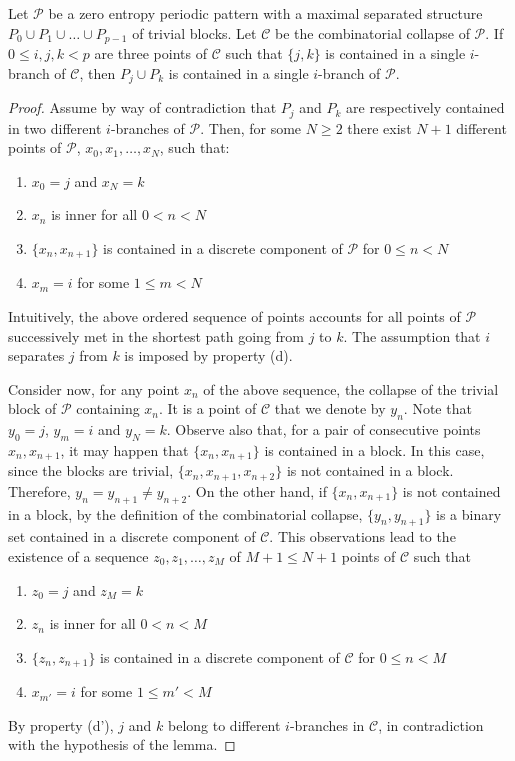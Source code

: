 \documentclass[10pt,a4paper]{amsart}
\begin{document}
\begin{lemma}\label{isi2}
Let $\mathcal{P}$ be a zero entropy periodic pattern with a maximal separated structure $P_0\cup P_1\cup\ldots\cup P_{p-1}$ of trivial blocks. Let $\mathcal{C}$ be the combinatorial collapse of $\mathcal{P}$. If $0\le i,j,k<p$ are three points of $\mathcal{C}$ such that $\{j,k\}$ is contained in a single $i$-branch of $\mathcal{C}$, then $P_j\cup P_k$ is contained in a single $i$-branch of $\mathcal{P}$.
\end{lemma}

\begin{proof}
Assume by way of contradiction that $P_j$ and $P_k$ are respectively contained in two different $i$-branches of $\mathcal{P}$. Then, for some $N\ge 2$ there exist $N+1$ different points of $\mathcal{P}$, $x_0,x_1,\ldots,x_N$, such that:
\begin{enumerate}
\item $x_0=j$ and $x_N=k$
\item $x_n$ is inner for all $0<n<N$
\item $\{x_n,x_{n+1}\}$ is contained in a discrete component of $\mathcal{P}$ for $0\le n<N$
\item $x_m=i$ for some $1\le m<N$
\end{enumerate}
Intuitively, the above ordered sequence of points accounts for all points of $\mathcal{P}$ successively met in the shortest path going from $j$ to $k$. The assumption that $i$ separates $j$ from $k$ is imposed by property (d).

Consider now, for any point $x_n$ of the above sequence, the collapse of the trivial block of $\mathcal{P}$ containing $x_n$. It is a point of $\mathcal{C}$ that we denote by $y_n$. Note that $y_0=j$, $y_m=i$ and $y_N=k$. Observe also that, for a pair of consecutive points $x_n,x_{n+1}$, it may happen that $\{x_n,x_{n+1}\}$ is contained in a block. In this case, since the blocks are trivial, $\{x_n,x_{n+1},x_{n+2}\}$ is not contained in a block. Therefore, $y_n=y_{n+1}\ne y_{n+2}$. On the other hand, if $\{x_n,x_{n+1}\}$ is not contained in a block, by the definition of the combinatorial collapse, $\{y_n,y_{n+1}\}$ is a binary set contained in a discrete component of $\mathcal{C}$. This observations lead to the existence of a sequence $z_0,z_1,\ldots,z_{M}$ of $M+1\le N+1$ points of $\mathcal{C}$ such that
\begin{enumerate}[(a')]
\item $z_0=j$ and $z_M=k$
\item $z_n$ is inner for all $0<n<M$
\item $\{z_n,z_{n+1}\}$ is contained in a discrete component of $\mathcal{C}$ for $0\le n<M$
\item $x_{m'}=i$ for some $1\le m'<M$
\end{enumerate}
By property (d'), $j$ and $k$ belong to different $i$-branches in $\mathcal{C}$, in contradiction with the hypothesis of the lemma.
\end{proof}
\end{document}
